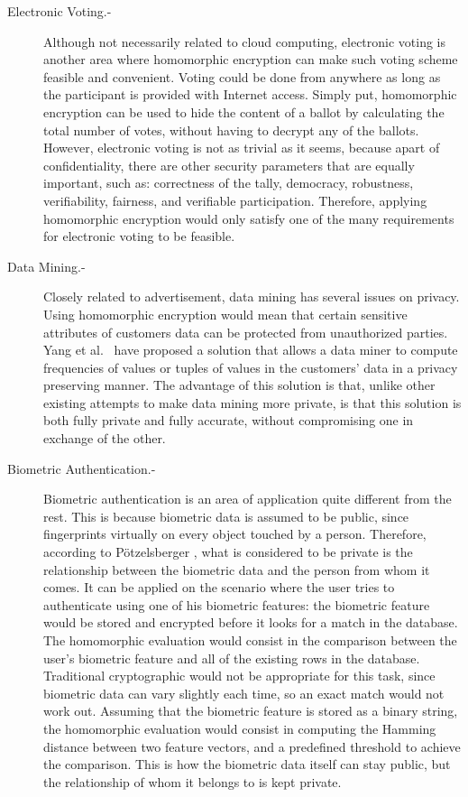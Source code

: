\begin{description}
\item[Electronic Voting.-] Although not necessarily related to cloud computing, electronic voting is another area where homomorphic encryption can make such voting scheme feasible and convenient. Voting could be done from anywhere as long as the participant is provided with Internet access. Simply put, homomorphic encryption can be used to hide the content of a ballot by calculating the total number of votes, without having to decrypt any of the ballots. However, electronic voting is not as trivial as it seems, because apart of confidentiality, there are other security parameters that are equally important, such as: correctness of the tally, democracy, robustness, verifiability, fairness, and verifiable participation. Therefore, applying homomorphic encryption would only satisfy one of the many requirements for electronic voting to be feasible.
\item[Data Mining.-] Closely related to advertisement, data mining has several issues on privacy. Using homomorphic encryption would mean that certain sensitive attributes of customers data can be protected from unauthorized parties. Yang et al.\ \cite{YangZhongWright} have proposed a solution that allows a data miner to compute frequencies of values or tuples of values in the customers' data in a privacy preserving manner. The advantage of this solution is that, unlike other existing attempts to make data mining more private, is that this solution is both fully private and fully accurate, without compromising one in exchange of the other.
\item[Biometric Authentication.-] Biometric authentication is an area of application quite different from the rest. This is because biometric data is assumed to be public, since fingerprints virtually on every object touched by a person. Therefore, according to P{\"o}tzelsberger \cite{potzelsberger2013kv}, what is considered to be private is the relationship between the biometric data and the person from whom it comes. It can be applied on the scenario where the user tries to authenticate using one of his biometric features: the biometric feature would be stored and encrypted before it looks for a match in the database. The homomorphic evaluation would consist in the comparison between the user's biometric feature and all of the existing rows in the database. Traditional cryptographic would not be appropriate for this task, since biometric data can vary slightly each time, so an exact match would not work out. Assuming that the biometric feature is stored as a binary string, the homomorphic evaluation would consist in computing the Hamming distance between two feature vectors, and a predefined threshold to achieve the comparison. This is how the biometric data itself can stay public, but the relationship of whom it belongs to is kept private.
\end{description}

